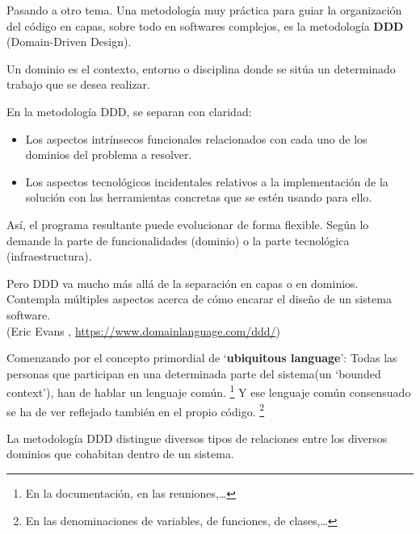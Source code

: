 \documentclass[spanish,12pt,a4paper,final,oneside]{book}
\begin{document}
Pasando a otro tema. Una metodología muy práctica para guiar la organización del código en capas, sobre todo en softwares complejos, es la metodología \textbf{DDD} (Domain-Driven Design).

Un dominio es el contexto, entorno o disciplina donde se sitúa un determinado trabajo que se desea realizar. 

En la metodología DDD, se separan con claridad:
\begin{itemize}
\item Los aspectos intrínsecos funcionales relacionados con cada uno de los dominios del problema a resolver. 
\item Los aspectos tecnológicos incidentales relativos a la implementación de la solución con las herramientas concretas que se estén usando para ello.
\end{itemize}

\vspace{0.2cm}
Así, el programa resultante puede evolucionar de forma flexible. Según lo demande la parte de funcionalidades (dominio) o la parte tecnológica (infraestructura).

Pero DDD va mucho más allá de la separación en capas o en dominios. Contempla múltiples aspectos acerca de cómo encarar el diseño de un sistema software. 
\\(Eric Evans , \url{https://www.domainlanguage.com/ddd/})

Comenzando por el concepto primordial de `\textbf{ubiquitous language}': Todas las personas que participan en una determinada parte del sistema(un `bounded context'), han de hablar un lenguaje común. \footnote{En la documentación, en las reuniones,\ldots} Y ese lenguaje común consensuado se ha de ver reflejado también en el propio código. \footnote{En las denominaciones de variables, de funciones, de clases,\ldots}


\vspace{0.5cm}
La metodología DDD distingue diversos tipos de relaciones entre los diversos dominios que cohabitan dentro de un sistema.
\end{document}
